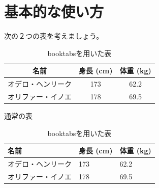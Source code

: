 \documentclass[uplatex,onecolumn,9pt,dvipdfmx]{jsarticle}
\begin{document}
\section{基本的な使い方}
次の２つの表を考えましょう。
\begin{table}[h]
    \begin{minipage}{0.48\linewidth}
        \centering
        \begin{tabular}{|c|c|c|} \hline
            名前 & 身長 (cm) & 体重 (kg) \\ \hline
            オデロ・ヘンリーク  & 173 & 62.2 \\ \hline 
            オリファー・イノエ  & 178 & 69.5 \\ \hline   
        \end{tabular}
        \caption{通常の表}
        \label{tbl:bad_example}
    \end{minipage}
    \hfill
    \begin{minipage}{0.48\linewidth}
        \centering
        \begin{tabular}{@{}lll@{}} \toprule
            名前 & 身長 (cm) & 体重 (kg) \\ \midrule
            オデロ・ヘンリーク  & 173 & 62.2 \\ 
            オリファー・イノエ  & 178 & 69.5 \\ \bottomrule   
        \end{tabular}
        \caption{booktabsを用いた表}
        \label{tbl:good_example}
    \end{minipage}
\end{table}
\end{document}
